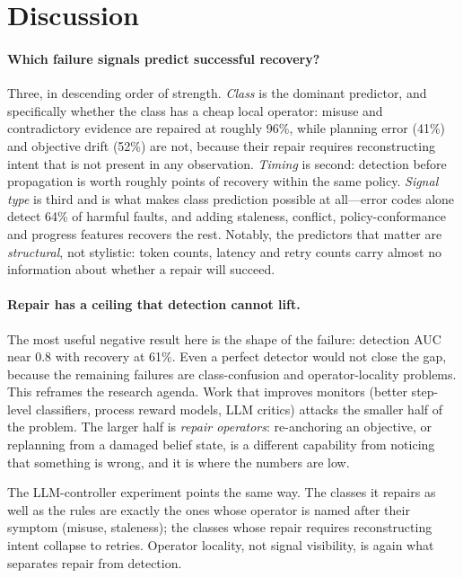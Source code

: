 \section{Discussion}\label{sec:discussion}

\paragraph{Which failure signals predict successful recovery?} Three, in descending order of
strength. \emph{Class} is the dominant predictor, and specifically whether the class has a cheap
local operator: misuse and contradictory evidence are repaired at roughly 96\%, while planning error
(41\%) and objective drift (52\%) are not, because their repair requires reconstructing intent that
is not present in any observation. \emph{Timing} is second: detection before propagation is worth
roughly \EarlyGap{} points of recovery within the same policy. \emph{Signal type} is third and is
what makes class prediction possible at all---error codes alone detect 64\% of harmful faults, and
adding staleness, conflict, policy-conformance and progress features recovers the rest. Notably, the
predictors that matter are \emph{structural}, not stylistic: token counts, latency and retry counts
carry almost no information about whether a repair will succeed.

\paragraph{Repair has a ceiling that detection cannot lift.} The most useful negative result here is
the shape of the failure: detection AUC near 0.8 with recovery at 61\%. Even a perfect detector would
not close the gap, because the remaining failures are class-confusion and operator-locality problems.
This reframes the research agenda. Work that improves monitors (better step-level classifiers,
process reward models, LLM critics) attacks the smaller half of the problem. The larger half is
\emph{repair operators}: re-anchoring an objective, or replanning from a damaged belief state, is a
different capability from noticing that something is wrong, and it is where the numbers are low.

The LLM-controller experiment points the same way. The classes it repairs as well as the rules are
exactly the ones whose operator is named after their symptom (misuse, staleness); the classes whose
repair requires reconstructing intent collapse to retries. Operator locality, not signal visibility,
is again what separates repair from detection.

